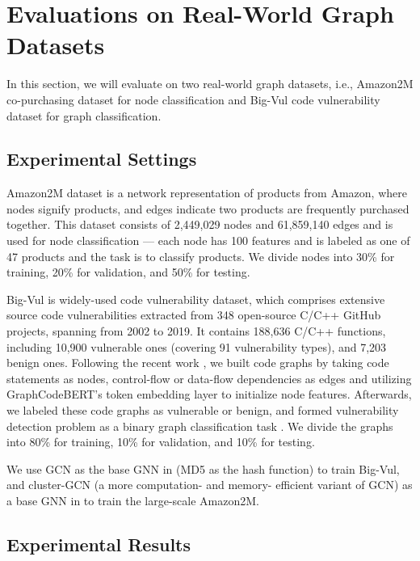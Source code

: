 \section{Evaluations on Real-World Graph Datasets}
\label{sec:realworld}

In this section, we will evaluate {\name} on two real-world  graph datasets, i.e., Amazon2M co-purchasing dataset \cite{clusterGCN} for node classification and Big-Vul code vulnerability dataset \cite{big_vul} for graph classification.  

\subsection{Experimental Settings}

Amazon2M dataset is a network representation of products from Amazon, where nodes signify products, and edges indicate two products are frequently purchased together. 
This dataset consists of 2,449,029 nodes and 61,859,140 edges and is used for node classification --- each node has 100 features and is labeled as one of 47 products and the task is to classify products. 
We divide nodes into 30\% for training, 20\% for validation, and 50\% for testing. 

Big-Vul is widely-used code vulnerability dataset, which comprises extensive source code vulnerabilities extracted from 348 open-source C/C++ GitHub projects, spanning from 2002 to 2019. It contains 188,636 C/C++ functions, 
including 10,900 vulnerable ones (covering 91 vulnerability types), 
and 7,203 benign ones. Following the recent work \cite{chu2024graph}, 
 we built code graphs by taking code statements as nodes, control-flow or data-flow
dependencies as edges and utilizing GraphCodeBERT’s\cite{guo2020graphcodebert} token embedding layer to initialize node features.  Afterwards, we labeled these code graphs as vulnerable or benign,   
and formed vulnerability detection problem as a binary graph classification task \cite{chu2024graph}. We divide the graphs into 80\% for training, 10\% for validation, and 10\% for testing.

 We use GCN as the base GNN in {\name} (MD5 as the hash function) to train Big-Vul, and cluster-GCN  \cite{clusterGCN} (a more computation- and memory- efficient variant of GCN) as a base GNN in {\name} to train the large-scale Amazon2M.  
 

\subsection{Experimental Results}

